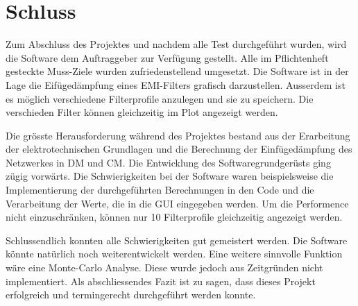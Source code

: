 \section{Schluss} \label{sec:schluss}
Zum Abschluss des Projektes und nachdem alle Test durchgeführt wurden, wird die Software dem Auftraggeber zur Verfügung gestellt. Alle im Pflichtenheft gesteckte Muss-Ziele wurden zufriedenstellend umgesetzt. Die Software ist in der Lage die Eifügedämpfung eines EMI-Filters grafisch darzustellen. Ausserdem ist es möglich verschiedene Filterprofile anzulegen und sie zu speichern. Die verschieden Filter können gleichzeitig im Plot angezeigt werden. 

Die grösste Herausforderung während des Projektes bestand aus der Erarbeitung der elektrotechnischen Grundlagen und die Berechnung der Einfügedämpfung des Netzwerkes in DM und CM. Die Entwicklung des Softwaregrundgerüsts ging zügig vorwärts. Die Schwierigkeiten bei der Software waren beispielsweise die Implementierung der durchgeführten Berechnungen in den Code und die Verarbeitung der Werte, die in die GUI eingegeben werden. Um die Performence nicht einzuschränken, können nur 10 Filterprofile gleichzeitig angezeigt werden.

Schlussendlich konnten alle Schwierigkeiten gut gemeistert werden. Die Software könnte natürlich noch weiterentwickelt werden.  Eine weitere sinnvolle Funktion wäre eine Monte-Carlo Analyse. Diese wurde jedoch aus Zeitgründen nicht implementiert. Als abschliessendes Fazit ist zu sagen, dass dieses Projekt erfolgreich und termingerecht durchgeführt werden konnte. 
